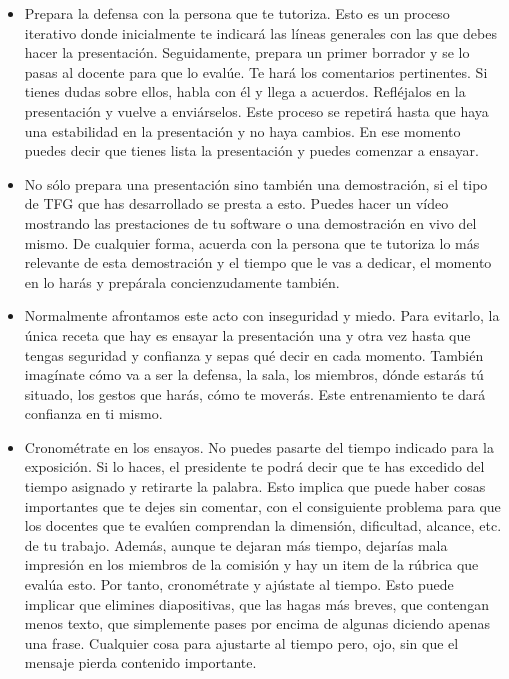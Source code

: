 \begin{itemize}

    \item Prepara la defensa con la persona que te tutoriza. Esto es un proceso iterativo donde inicialmente te indicará las líneas generales con las que debes hacer la presentación. Seguidamente, prepara un primer borrador y se lo pasas al docente para que lo evalúe. Te hará los comentarios pertinentes. Si tienes dudas sobre ellos, habla con él y llega a acuerdos. Refléjalos en la presentación y vuelve a enviárselos. Este proceso se repetirá hasta que haya una estabilidad en la presentación y no haya cambios. En ese momento puedes decir que tienes lista la presentación y puedes comenzar a ensayar.

    \item No sólo prepara una presentación sino también una demostración, si el tipo de TFG que has desarrollado se presta a esto. Puedes hacer un vídeo mostrando las prestaciones de tu software o una demostración en vivo del mismo. De cualquier forma, acuerda con la persona que te tutoriza lo más relevante de esta demostración y el tiempo que le vas a dedicar, el momento en lo harás y prepárala concienzudamente también. 

    \item Normalmente afrontamos este acto con inseguridad y miedo. Para evitarlo, la única receta que hay es ensayar la presentación una y otra vez hasta que tengas seguridad y confianza y sepas qué decir en cada momento. También imagínate cómo va a ser la defensa, la sala, los miembros, dónde estarás tú situado, los gestos que harás, cómo te moverás. Este entrenamiento te dará confianza en ti mismo.

    \item Cronométrate en los ensayos. No puedes pasarte del tiempo indicado para la exposición. Si lo haces, el presidente te podrá decir que te has excedido del tiempo asignado y retirarte la palabra. Esto implica que puede haber cosas importantes que te dejes sin comentar, con el consiguiente problema para que los docentes que te evalúen comprendan la dimensión, dificultad, alcance, etc. de tu trabajo. Además, aunque te dejaran más tiempo, dejarías mala impresión en los miembros de la comisión y hay un item de la rúbrica que evalúa esto. Por tanto, cronométrate y ajústate al tiempo. Esto puede implicar que elimines diapositivas, que las hagas más breves, que contengan menos texto, que simplemente pases por encima de algunas diciendo apenas una frase. Cualquier cosa para ajustarte al tiempo pero, ojo, sin que el mensaje pierda contenido importante.


\end{itemize}
